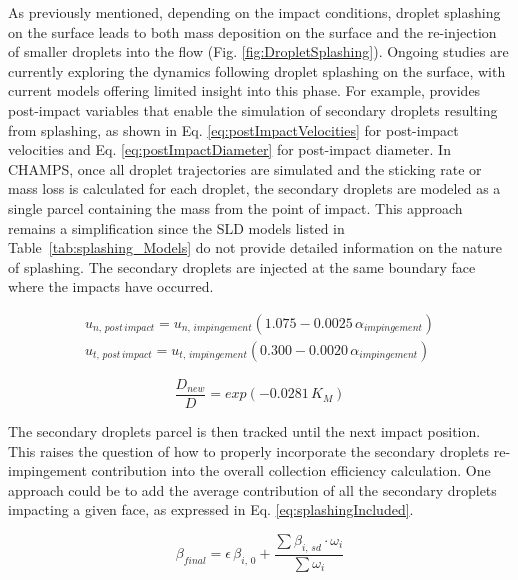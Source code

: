 As previously mentioned, depending on the impact conditions, droplet splashing on the surface leads to both mass deposition on the surface and the re-injection of smaller droplets into the flow (Fig. \ref{fig:DropletSplashing}). Ongoing studies are currently exploring the dynamics following droplet splashing on the surface, with current models offering limited insight into this phase. For example, \cite{wright2004semi} provides post-impact variables that enable the simulation of secondary droplets resulting from splashing, as shown in Eq. \ref{eq:postImpactVelocities} for post-impact velocities and Eq. \ref{eq:postImpactDiameter} for post-impact diameter. In CHAMPS, once all droplet trajectories are simulated and the sticking rate or mass loss is calculated for each droplet, the secondary droplets are modeled as a single parcel containing the mass from the point of impact. This approach remains a simplification since the SLD models listed in Table~\ref{tab:splashing_Models} do not provide detailed information on the nature of splashing. The secondary droplets are injected at the same boundary face where the impacts have occurred.

\begin{equation}
\begin{split}
    u_{n,\, post \, impact} = u_{n,\, impingement} (1.075 - 0.0025 \, \alpha_{impingement}) \\
    u_{t,\, post \, impact} = u_{t,\, impingement} (0.300 - 0.0020 \, \alpha_{impingement})
\end{split}
\label{eq:postImpactVelocities}
\end{equation}

\begin{equation}
    \frac{D_{new}}{D} = exp(-0.0281 \, K_M)
\label{eq:postImpactDiameter}
\end{equation}

\noindent The secondary droplets parcel is then tracked until the next impact position. This raises the question of how to properly incorporate the secondary droplets re-impingement contribution into the overall collection efficiency calculation. One approach could be to add the average contribution of all the secondary droplets impacting a given face, as expressed in Eq. \ref{eq:splashingIncluded}.

\begin{equation}
\beta_{final} = \epsilon \, \beta_{i, \, 0} + \frac{\sum \beta_{i, \, sd} \cdot \omega_i}{\sum \omega_i}
\label{eq:splashingIncluded}
\end{equation}

